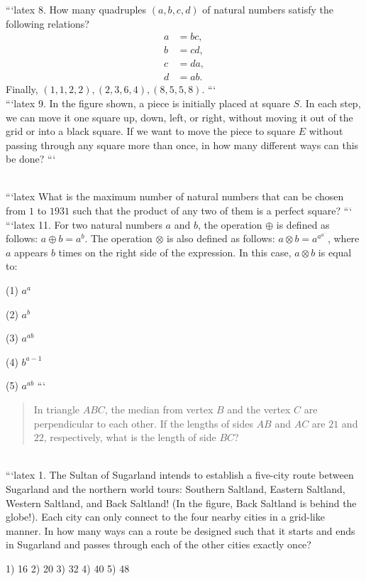 ```latex
8. How many quadruples $(a, b, c, d)$ of natural numbers satisfy the following relations?
\[
\begin{align*}
a &= bc, \\
b &= cd, \\
c &= da, \\
d &= ab.
\end{align*}
\]
Finally, $(1, 1, 2, 2), (2, 3, 6, 4), (8, 5, 5, 8)$.
```
\\
```latex
9. In the figure shown, a piece is initially placed at square $S$. In each step, we can move it one square up, down, left, or right, without moving it out of the grid or into a black square. If we want to move the piece to square $E$ without passing through any square more than once, in how many different ways can this be done?
```

\\
```latex
What is the maximum number of natural numbers that can be chosen from $1$ to $1931$ such that the product of any two of them is a perfect square?
```
\\
```latex
11. For two natural numbers $a$ and $b$, the operation $\oplus$ is defined as follows: $a \oplus b = a^b$. The operation $\otimes$ is also defined as follows: $a \otimes b = a^{a^{a^{\cdots}}}$, where $a$ appears $b$ times on the right side of the expression. In this case, $a \otimes b$ is equal to:

(1) $a^a$

(2) $a^b$

(3) $a^{ab}$

(4) $b^{a-1}$

(5) $a^{ab}$
```
\\
\begin{quote}
In triangle $ABC$, the median from vertex $B$ and the vertex $C$ are perpendicular to each other. If the lengths of sides $AB$ and $AC$ are $21$ and $22$, respectively, what is the length of side $BC$?
\end{quote}
\\
```latex
1. The Sultan of Sugarland intends to establish a five-city route between Sugarland and the northern world tours: Southern Saltland, Eastern Saltland, Western Saltland, and Back Saltland! (In the figure, Back Saltland is behind the globe!). Each city can only connect to the four nearby cities in a grid-like manner. In how many ways can a route be designed such that it starts and ends in Sugarland and passes through each of the other cities exactly once?

1) 16
2) 20
3) 32
4) 40
5) 48

